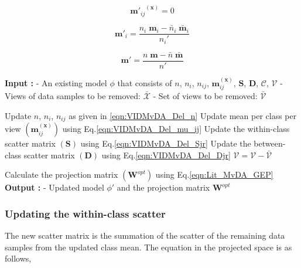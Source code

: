 \begin{equation}
\label{eqn:VIDMvDA_Del_mu_ij}
{\textbf{m}'_{ij}}^{(\textbf{x})} = 0
\end{equation}

\begin{equation}
\label{eqn:VIDMvDA_Del_mu_i}
\textbf{m}'_{i} = \frac{n_i \; \textbf{m}_{i} - \bar{n}_i \; \bar{\textbf{m}}_i}{n_i'}
\end{equation}

\begin{equation}
\label{eqn:VIDMvDA_Del_mu}
\textbf{m}' = \frac{n \; \textbf{m} - \bar{n} \; \bar{\textbf{m}}}{n'}
\end{equation}




\begin{algorithm}[t]
\centering
\caption{VIDMvDA: Decremental algorithm}
\label{VIDMvDA_Algo_Del}
    \begin{algorithmic}
	\STATE \textbf{Input :}
	\STATE - An existing model $\phi$ that consists of $n$, $n_i$, $n_{ij}$, $\textbf{m}_{ij}^{(\textbf{x})}$, $\textbf{S}$, $\textbf{D}$, $\mathcal{C}$, $\mathcal{V}$
	\STATE 		- Views of data samples to be removed: $\bar{\mathcal{X}}$
	\STATE 		- Set of views to be removed: $\bar{\mathcal{V}}$ \vspace{0.1cm}

		
		\STATE \small Update $n$, $n_i$, $n_{ij}$ as given in \ref{eqn:VIDMvDA_Del_n}\;
		\STATE \small Update mean per class per view $(\textbf{m}_{ij}^{(\textbf{x})})$ using Eq.\ref{eqn:VIDMvDA_Del_mu_ij}\;
		\STATE \small Update the within-class scatter matrix $(\textbf{S})$ using Eq.\ref{eqn:VIDMvDA_Del_Sjr}\;
		\STATE \small Update the between-class scatter matrix $(\textbf{D})$ using Eq.\ref{eqn:VIDMvDA_Del_Djr}\;
		\STATE $\mathcal{V} = \mathcal{V} - \bar{\mathcal{V}}$ \;
			
		\STATE \small Calculate the projection matrix $(\textbf{W}^{opt})$ using Eq.\ref{eqn:Lit_MvDA_GEP}\;
	\ENDWHILE
	\STATE \textbf{Output :}
	\STATE - Updated model $\phi'$ and the projection matrix $\textbf{W}^{opt}$

\end{algorithmic}
\end{algorithm}





\subsubsection{Updating the within-class scatter}
\label{ssubs:VIDMvDA_Dec_Sw}
The new scatter matrix is the summation of the scatter of the remaining data samples from the updated class mean. The equation in the projected space is as follows,

